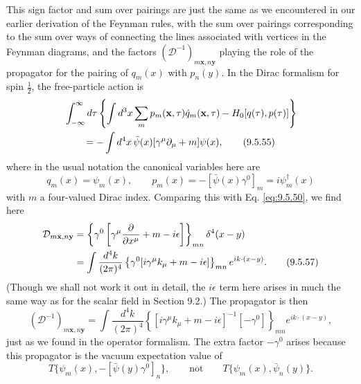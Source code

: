 This sign factor and sum over pairings are just the same as we encountered in
our earlier derivation of the Feynman rules, with the sum over pairings
corresponding to the sum over ways of connecting the lines associated with
vertices in the Feynman diagrams, and the factors
$(\mathcal{D}^{-1})_{m\mathbf{x},n\mathbf{y}}$ playing the role of the
propagator for the pairing of $q_m(x)$ with $p_n(y)$. In the Dirac formalism
for spin $\frac12$, the free-particle action is
\begin{align}
&\int_{-\infty}^{\infty}d\tau
 \left\{\int d^3x\sum_mp_m(\mathbf{x},\tau)\dot q_m(\mathbf{x},\tau)
 -H_0[q(\tau),p(\tau)]\right\}
\notag\\
&\qquad=-\int d^4x\,\bar\psi(x)
 [\gamma^\mu\partial_\mu+m]\psi(x),
\tag{9.5.55}\label{eq:9.5.55}
\end{align}
where in the usual notation the canonical variables here are
\begin{equation}
q_m(x)=\psi_m(x),
\qquad
p_m(x)=-[\bar\psi(x)\gamma^0]_m=i\psi_m^\dagger(x)
\tag{9.5.56}\label{eq:9.5.56}
\end{equation}
with $m$ a four-valued Dirac index. Comparing this with Eq. \eqref{eq:9.5.50}, we find
here
\begin{align}
\mathcal{D}_{m\mathbf{x},n\mathbf{y}}
&=\left\{\gamma^0\left[\gamma^\mu\frac{\partial}{\partial x^\mu}
 +m-i\epsilon\right]\right\}_{mn}
 \delta^4(x-y)\notag\\
&=\int\frac{d^4k}{(2\pi)^4}
 \left\{\gamma^0[i\gamma^\mu k_\mu+m-i\epsilon]\right\}_{mn}
 e^{ik\cdot(x-y)}.
\tag{9.5.57}\label{eq:9.5.57}
\end{align}
(Though we shall not work it out in detail, the $i\epsilon$ term here arises
in much the same way as for the scalar field in Section 9.2.) The propagator is
then
\begin{equation}
(\mathcal{D}^{-1})_{m\mathbf{x},n\mathbf{y}}
=\int\frac{d^4k}{(2\pi)^4}
 \left\{[i\gamma^\mu k_\mu+m-i\epsilon]^{-1}[-\gamma^0]\right\}_{mn}
 e^{ik\cdot(x-y)},
\tag{9.5.58}\label{eq:9.5.58}
\end{equation}
just as we found in the operator formalism. The extra factor $-\gamma^0$
arises because this propagator is the vacuum expectation value of
\[
T\{\psi_m(x),-[\bar\psi(y)\gamma^0]_n\},
\qquad\text{not}\qquad
T\{\psi_m(x),\bar\psi_n(y)\}.
\]

